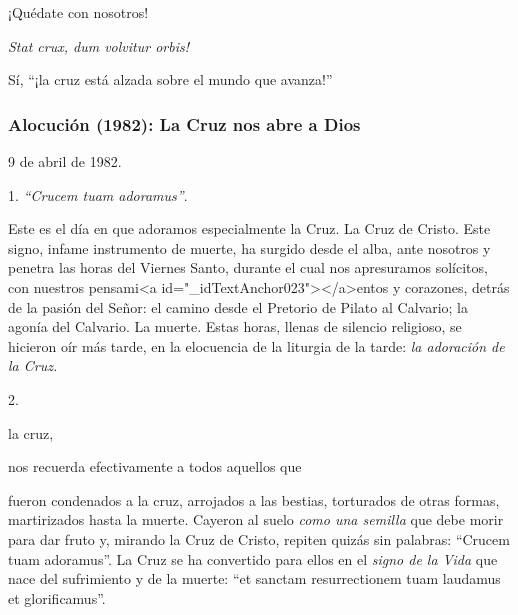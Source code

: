 			\begin{bodyprose}¡Quédate con nosotros!\end{bodyprose}
			
			\begin{body}\textit{Stat crux, dum volvitur orbis! }\end{body}
			
			\begin{body}Sí, “¡la cruz está alzada sobre el mundo que avanza!”\end{body}
			
			\subsubsection{Alocución (1982): La Cruz nos abre a Dios}
			
			\begin{referencia}9 de abril de 1982. \end{referencia}
			
			\begin{body}1. \textit{“Crucem tuam adoramus”}. \end{body}
			
			\begin{body}Este es el día en que adoramos especialmente la Cruz. La Cruz de Cristo. Este signo, infame instrumento de muerte, ha surgido desde el alba, ante nosotros y penetra las horas del Viernes Santo, durante el cual nos apresuramos solícitos, con nuestros pensami<a id="_idTextAnchor023"></a>entos y corazones, detrás de la pasión del Señor: el camino desde el Pretorio de Pilato al Calvario; la agonía del Calvario. La muerte. Estas horas, llenas de silencio religioso, se hicieron oír más tarde, en la elocuencia de la liturgia de la tarde: \textit{la adoración de la Cruz. }\begin{bodysmall}\end{bodysmall}\end{body}
			
			\begin{body}2. \begin{bodysmall}[En el Coliseo,]\end{bodysmall} la cruz, \begin{bodysmall}\end{bodysmall} nos recuerda efectivamente a todos aquellos que \begin{bodysmall}\end{bodysmall} fueron condenados a la cruz, arrojados a las bestias, torturados de otras formas, martirizados hasta la muerte. Cayeron al suelo \textit{como una semilla} que debe morir para dar fruto y, mirando la Cruz de Cristo, repiten quizás sin palabras: “Crucem tuam adoramus”. La Cruz se ha convertido para ellos en el \textit{signo de la Vida} que nace del sufrimiento y de la muerte: “et sanctam resurrectionem tuam laudamus et glorificamus”. \end{body}
			
